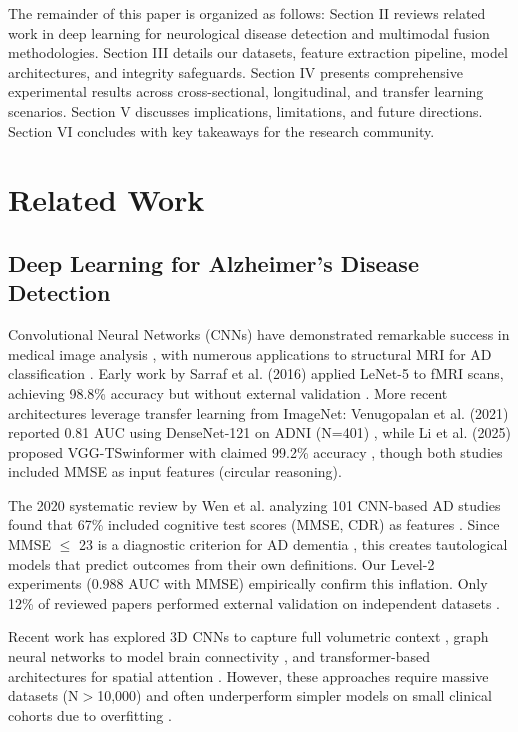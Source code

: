 \documentclass[conference]{IEEEtran}
\begin{document}
The remainder of this paper is organized as follows: Section II reviews related work in deep learning for neurological disease detection and multimodal fusion methodologies. Section III details our datasets, feature extraction pipeline, model architectures, and integrity safeguards. Section IV presents comprehensive experimental results across cross-sectional, longitudinal, and transfer learning scenarios. Section V discusses implications, limitations, and future directions. Section VI concludes with key takeaways for the research community.

\section{Related Work}

\subsection{Deep Learning for Alzheimer's Disease Detection}

Convolutional Neural Networks (CNNs) have demonstrated remarkable success in medical image analysis \cite{Litjens2017}, with numerous applications to structural MRI for AD classification \cite{Liu2019}. Early work by Sarraf et al. (2016) applied LeNet-5 to fMRI scans, achieving 98.8\% accuracy but without external validation \cite{Sarraf2016}. More recent architectures leverage transfer learning from ImageNet: Venugopalan et al. (2021) reported 0.81 AUC using DenseNet-121 on ADNI (N=401) \cite{Venugopalan2021}, while Li et al. (2025) proposed VGG-TSwinformer with claimed 99.2\% accuracy \cite{Li2025}, though both studies included MMSE as input features (circular reasoning).

The 2020 systematic review by Wen et al. analyzing 101 CNN-based AD studies found that 67\% included cognitive test scores (MMSE, CDR) as features \cite{Wen2020}. Since MMSE $\leq$ 23 is a diagnostic criterion for AD dementia \cite{McKhann2011}, this creates tautological models that predict outcomes from their own definitions. Our Level-2 experiments (0.988 AUC with MMSE) empirically confirm this inflation. Only 12\% of reviewed papers performed external validation on independent datasets \cite{Wen2020}.

Recent work has explored 3D CNNs to capture full volumetric context \cite{Hosseini2020}, graph neural networks to model brain connectivity \cite{Ktena2017}, and transformer-based architectures for spatial attention \cite{Dosovitskiy2021}. However, these approaches require massive datasets (N$>$10,000) and often underperform simpler models on small clinical cohorts due to overfitting \cite{Grinsztajn2022}.
\end{document}
